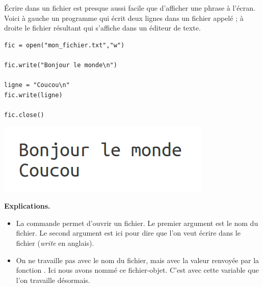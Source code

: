 \documentclass[11pt,class=report,crop=false]{standalone}
\begin{document}


\begin{cours}


\'Ecrire dans un fichier est presque aussi facile que d'afficher une phrase à l'écran.
Voici à gauche un programme qui écrit deux lignes dans un fichier appelé  ; à droite le fichier résultant qui s'affiche dans un éditeur de texte.
\begin{center}
\begin{minipage}{0.5\textwidth}
\begin{lstlisting}
fic = open("mon_fichier.txt","w")

fic.write("Bonjour le monde\n")

ligne = "Coucou\n"
fic.write(ligne)

fic.close()
\end{lstlisting}
\end{minipage}
\begin{minipage}{0.3\textwidth}
\includegraphics[scale=0.5]{ecran-fichiers-cours-1}
\end{minipage}
\end{center}


\textbf{Explications.}
\begin{itemize}
  \item La commande  permet d'ouvrir un fichier. Le premier argument est le nom du fichier. Le second argument est ici  pour dire que l'on veut écrire dans le fichier (\emph{write} en anglais).
  
  \item On ne travaille pas avec le nom du fichier, mais avec la valeur renvoyée par la fonction . Ici nous avons nommé  ce fichier-objet. C'est avec cette variable  que l'on travaille désormais.
  

\end{itemize}
\end{cours}
\end{document}
